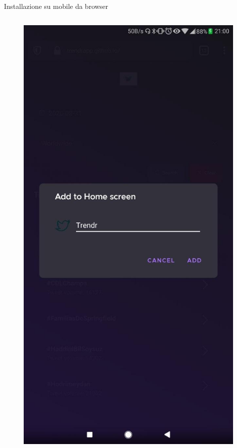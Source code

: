 \documentclass[xcolor=svgnames, aspectratio=169]{beamer}
\begin{document}
\begin{frame}{Installazione su mobile da browser}
\begin{columns}[t]
        \begin{figure}[H]
            \centering
            \includegraphics[width=0.32\paperwidth,height=0.7\paperheight,keepaspectratio]{Mobile_Firefox_Installazione_Conferma.jpg}
        \end{figure}

\end{columns}
\end{frame}
\end{document}
